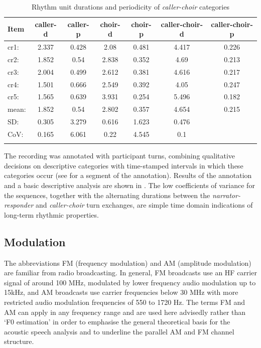 \documentclass[output=paper,colorlinks,citecolor=brown]{langscibook}
\begin{document}
\begin{table}
\small
\caption{Rhythm unit durations and periodicity of \textit{caller-choir} categories}
\label{table:table01}
\begin{tabular}{l *6{S[table-format=1.3]}}
\lsptoprule
Item	& {caller-d} & {caller-p} & {choir-d} & {choir-p} & {caller-choir-d} & {caller-choir-p}\\\midrule
cr1:	& 2.337	& 0.428	& 2.08	& 0.481	& 4.417	& 0.226\\
cr2:	& 1.852	& 0.54	& 2.838	& 0.352	& 4.69	& 0.213\\
cr3:	& 2.004	& 0.499	& 2.612	& 0.381	& 4.616	& 0.217\\
cr4:	& 1.501	& 0.666	& 2.549	& 0.392	& 4.05	& 0.247\\
cr5:	& 1.565	& 0.639	& 3.931	& 0.254	& 5.496	& 0.182\\\addlinespace
mean:	& 1.852	& 0.54	& 2.802	& 0.357	& 4.654	& 0.215\\
SD:	    & 0.305	& 3.279	& 0.616	& 1.623	& 0.476	& \\
CoV:	& 0.165	& 6.061	& 0.22	& 4.545	& 0.1	& \\
\lsptoprule
\end{tabular}
\end{table}

The recording was annotated with participant turns, combining qualitative decisions on descriptive categories with time-stamped intervals in which these categories occur (see  for a segment of the annotation). Results of the annotation and a basic descriptive analysis are shown in . The low coefficients of variance for the sequences, together with the alternating durations between the \textit{narrator-responder} and \textit{caller-choir} turn exchanges, are simple time domain indications of long-term rhythmic properties.

\subsection{Modulation}

The abbreviations FM (frequency modulation) and AM (amplitude modulation) are familiar from radio broadcasting. In general, FM broadcasts use an HF carrier signal of around 100 MHz, modulated by lower frequency audio modulation up to 15kHz, and AM broadcasts use carrier frequencies below 30 MHz with more restricted audio modulation frequencies of 550 to 1720 Hz. The terms FM and AM can apply in any frequency range and are used here advisedly rather than `F0 estimation' in order to emphasise the general theoretical basis for the acoustic speech analysis and to underline the parallel AM and FM channel structure.
\end{document}

